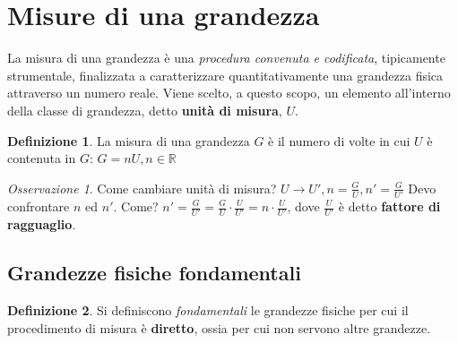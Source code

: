 \documentclass[a4paper, 12pt]{report}
\theoremstyle{definition}
\newtheorem{definition}{Definizione}[section]
\theoremstyle{remark}
\newtheorem*{remark}{Osservazione}
\theoremstyle{plain}
\newcommand{\R}{\mathbb{R}}
\begin{document}
\section{Misure di una grandezza}

La misura di una grandezza è una {\it procedura convenuta e codificata}, tipicamente strumentale, finalizzata a caratterizzare quantitativamente una grandezza fisica attraverso un numero reale.
Viene scelto, a questo scopo, un elemento all'interno della classe di grandezza, detto {\bf unità di misura}, $U$.

\begin{definition}
    La misura di una grandezza $G$ è il numero di volte in cui $U$ è contenuta in $G$: $G = nU, n \in \R$
\end{definition}

\begin{remark}
    Come cambiare unità di misura?
    $U \rightarrow U', n = \frac{G}{U}, n' = \frac{G}{U'}$
    Devo confrontare $n$ ed $n'$. Come?
    $n' = \frac{G}{U'} = \frac{G}{U} \cdot \frac{U}{U'} = n \cdot \frac{U}{U'}$, dove $\frac{U}{U'}$ è detto {\bf fattore di ragguaglio}.
\end{remark}

\subsection{Grandezze fisiche fondamentali}

\begin{definition}
    Si definiscono {\it fondamentali} le grandezze fisiche per cui il procedimento di misura è {\bf diretto}, ossia per cui non servono altre grandezze.
\end{definition}
\end{document}
